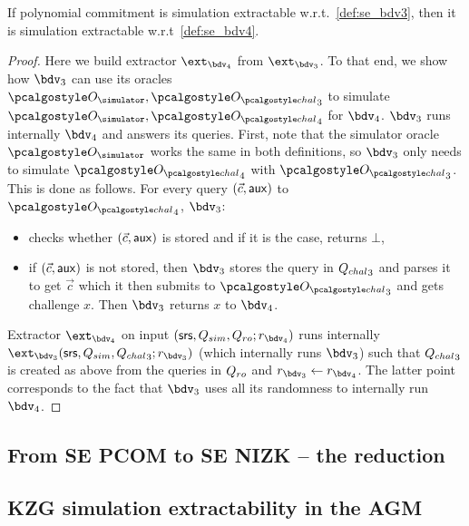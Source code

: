 \documentclass[runningheads,11pt]{llncs}
\let\spvec\vec \let\vec\accentvec
\let\vec\spvec
\begin{document}
\begin{lemma}[]
  If polynomial commitment is simulation extractable w.r.t.~\cref{def:se_bdv3}, then
  it is simulation extractable w.r.t~\cref{def:se_bdv4}.
\end{lemma}
\begin{proof}
  Here we build extractor $\ext_{\bdv_4}$ from $\ext_{\bdv_3}$. To that end, we show
  how $\bdv_3$ can use its oracles $\oracles, \oraclec_3$ to simulate
  $\oracles, \oraclec_4$ for $\bdv_4$. $\bdv_3$ runs internally $\bdv_4$ and answers
  its queries. First, note that the simulator oracle $\oracles$ works the same in
  both definitions, so $\bdv_3$ only needs to simulate $\oraclec_4$ with
  $\oraclec_3$. This is done as follows. For every query $(\vec{c}, \aux)$ to
  $\oraclec_4$, $\bdv_3$:
  \begin{itemize}
  \item checks whether $(\vec{c}, \aux)$ is stored and if it is the case, returns
    $\bot$,
  \item if $(\vec{c}, \aux)$ is not stored, then $\bdv_3$ stores the query in
    ${Q_{chal}}_3$ and parses it to get $\vec{c}$ which it then submits to $\oraclec_3$
    and gets challenge $x$. Then $\bdv_3$ returns $x$ to $\bdv_4$.
  \end{itemize}

  Extractor $\ext_{\bdv_4}$ on input $(\srs, \Qsim, \Qh; r_{\bdv_4})$ runs internally
  $\ext_{\bdv_3} (\srs, \Qsim, \Qchal_3; r_{\bdv_3})$ (which internally runs
  $\bdv_3$) such that ${Q_{chal}}_3$ is created as above from the queries in $Q_{ro}$ and
  $r_{\bdv_3} \gets r_{\bdv_4}$. The latter point corresponds to the fact that
  $\bdv_3$ uses all its randomness to internally run $\bdv_4$.
\end{proof}

\subsection{From SE PCOM to SE NIZK -- the reduction}
\subsection{KZG simulation extractability in the AGM}
\end{document}
